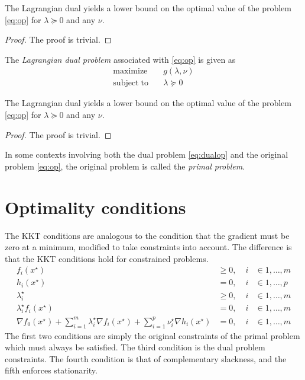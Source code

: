 \begin{theorem}
  The Lagrangian dual yields a lower bound on the optimal value of the problem \eqref{eq:op} for $\lambda \succeq 0$ and any $\nu$.
\end{theorem}
\begin{proof}
  The proof is trivial.
\end{proof}

The \emph{Lagrangian dual problem} associated with \eqref{eq:op} is given as
\begin{align} \label{eq:dualop}
\mathrm{maximize}    \quad & g(\lambda, \nu) \nonumber \\
\mathrm{subject\;to} \quad & \lambda \succeq 0
\end{align}

\begin{theorem}
  The Lagrangian dual yields a lower bound on the optimal value of the problem \eqref{eq:op} for $\lambda \succeq 0$ and any $\nu$.
\end{theorem}
\begin{proof}
  The proof is trivial.
\end{proof}
In some contexts involving both the dual problem \eqref{eq:dualop} and the original problem \eqref{eq:op}, the original problem is called the \emph{primal problem}.

\section{Optimality conditions}
The KKT conditions are analogous to the condition that the gradient must be zero at a minimum, modified to take constraints into account. The difference is that the KKT conditions hold for constrained problems.
\begin{align} \label{eq:kkt}
 f_i(x^\star) & \geq 0, \; & i & \in {1,\dots,m} \nonumber \\
 h_i(x^\star) & = 0, \; & i & \in {1,\dots,p} \nonumber \\
 \lambda_i^\star & \geq 0, \; & i & \in {1,\dots,m} \\
 \lambda_i^\star f_i(x^\star) & = 0, \; & i & \in {1,\dots,m} \nonumber \\
 \nabla f_0(x^\star) + \sum_{i=1}^m \lambda_i^\star \nabla f_i(x^\star)
  + \sum_{i=1}^p \nu_i^\star \nabla h_i(x^\star) & = 0, \; & i & \in {1,\dots,m} \nonumber
\end{align}
The first two conditions are simply the original constraints of the primal problem which must always be satisfied. The third condition is the dual problem constraints. The fourth condition is that of complementary slackness, and the fifth enforces stationarity.

